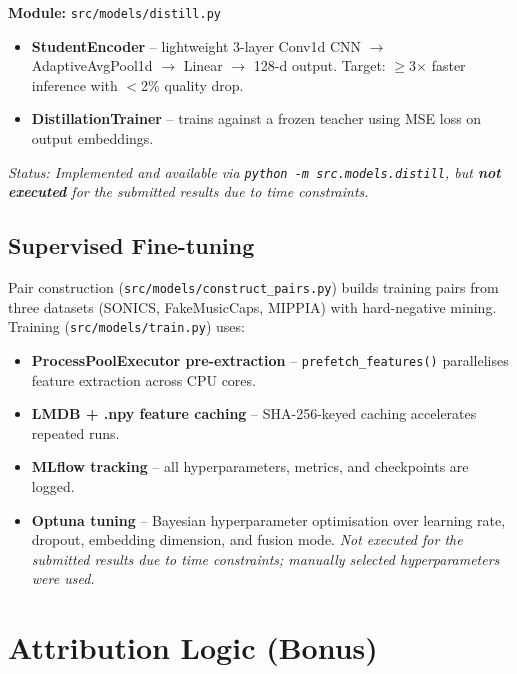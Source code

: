 \documentclass[11pt,a4paper]{article}
\begin{document}
\textbf{Module:} \texttt{src/models/distill.py}

\begin{itemize}[nosep]
  \item \textbf{StudentEncoder} -- lightweight 3-layer Conv1d CNN $\to$ AdaptiveAvgPool1d $\to$ Linear $\to$ 128-d output. Target: $\geq$3$\times$ faster inference with $<$2\% quality drop.
  \item \textbf{DistillationTrainer} -- trains against a frozen teacher using MSE loss on output embeddings.
\end{itemize}

\noindent
\textit{Status: Implemented and available via \texttt{python -m src.models.distill}, but \textbf{not executed} for the submitted results due to time constraints.}

\subsection{Supervised Fine-tuning}

Pair construction (\texttt{src/models/construct\_pairs.py}) builds training pairs from three datasets (SONICS, FakeMusicCaps, MIPPIA) with hard-negative mining. Training (\texttt{src/models/train.py}) uses:

\begin{itemize}[nosep]
  \item \textbf{ProcessPoolExecutor pre-extraction} -- \texttt{prefetch\_features()} parallelises feature extraction across CPU cores.
  \item \textbf{LMDB + .npy feature caching} -- SHA-256-keyed caching accelerates repeated runs.
  \item \textbf{MLflow tracking} -- all hyperparameters, metrics, and checkpoints are logged.
  \item \textbf{Optuna tuning} -- Bayesian hyperparameter optimisation over learning rate, dropout, embedding dimension, and fusion mode. \textit{Not executed for the submitted results due to time constraints; manually selected hyperparameters were used.}
\end{itemize}


\section{Attribution Logic (Bonus)}
\label{sec:attribution}
\end{document}
